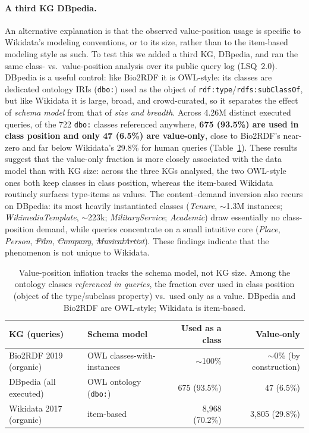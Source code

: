 \documentclass[sw]{iosart2x}
\providecommand{\DIFadd}[1]{{\protect\color{blue}\uwave{#1}}} %
\providecommand{\DIFdel}[1]{{\protect\color{red}\sout{#1}}} %
\providecommand{\DIFaddbegin}{} %
\providecommand{\DIFaddend}{} %
\providecommand{\DIFdelbegin}{} %
\providecommand{\DIFdelend}{} %
\providecommand{\DIFscaledelfig}{0.5}
\newlength{\DIFdelgraphicswidth} %
\newlength{\DIFdelgraphicsheight} %
\providecommand{\DIFaddincludegraphics}[2][]{{\color{blue}\fbox{\DIFOincludegraphics[#1]{#2}}}} %
\providecommand{\DIFdelincludegraphics}[2][]{%
\sbox{\DIFdelgraphicsbox}{\DIFOincludegraphics[#1]{#2}}%
\settoboxwidth{\DIFdelgraphicswidth}{\DIFdelgraphicsbox} %
\settoboxtotalheight{\DIFdelgraphicsheight}{\DIFdelgraphicsbox} %
\scalebox{\DIFscaledelfig}{%
\parbox[b]{\DIFdelgraphicswidth}{\usebox{\DIFdelgraphicsbox}\\[-\baselineskip] \rule{\DIFdelgraphicswidth}{0em}}\llap{\resizebox{\DIFdelgraphicswidth}{\DIFdelgraphicsheight}{%
\setlength{\unitlength}{\DIFdelgraphicswidth}%
\begin{picture}(1,1)%
\thicklines\linethickness{2pt} %
{\color[rgb]{1,0,0}\put(0,0){\framebox(1,1){}}}%
{\color[rgb]{1,0,0}\put(0,0){\line( 1,1){1}}}%
{\color[rgb]{1,0,0}\put(0,1){\line(1,-1){1}}}%
\end{picture}%
}\hspace*{3pt}}} %
} %
\DeclareRobustCommand{\DIFaddbegin}{\DIFOaddbegin \let\includegraphics\DIFaddincludegraphics} %
\DeclareRobustCommand{\DIFaddend}{\DIFOaddend \let\includegraphics\DIFOincludegraphics} %
\DeclareRobustCommand{\DIFdelbegin}{\DIFOdelbegin \let\includegraphics\DIFdelincludegraphics} %
\DeclareRobustCommand{\DIFdelend}{\DIFOaddend \let\includegraphics\DIFOincludegraphics} %
\begin{document}
\paragraph{\textbf{A third KG DBpedia.}} An alternative explanation is that the observed value-position usage is specific to Wikidata's modeling conventions, or to its size, rather than to the item-based modeling style as such. To test this we added a third KG, DBpedia, and ran the same class- vs.\ value-position analysis over its public query log (LSQ~2.0). DBpedia is a useful control: like Bio2RDF it is OWL-style: its classes are dedicated ontology IRIs (\texttt{dbo:}) used as the object of \texttt{rdf:type}/\texttt{rdfs:subClassOf}, but like Wikidata it is large, broad, and crowd-curated, so it separates the effect of \emph{schema model} from that of \emph{size and breadth}. Across 4.26M distinct executed queries, of the 722 \texttt{dbo:} classes referenced anywhere, \textbf{675 (93.5\%) are used in class position and only 47 (6.5\%) are value-only}, close to Bio2RDF's near-zero and far below Wikidata's 29.8\% for human queries (Table~\ref{tab:generality}). These results suggest that the value-only fraction is more closely associated with the data model than with KG size: across the three KGs analysed, the two OWL-style ones both keep classes in class position, whereas the item-based Wikidata routinely surfaces type-items as values. The content--demand inversion also recurs on DBpedia: its most heavily instantiated classes (\emph{Tenure}, $\sim$1.3M instances; \emph{WikimediaTemplate}, $\sim$223k; \emph{MilitaryService}; \emph{Academic}) draw essentially no class-position demand, while queries concentrate on a small intuitive core (\emph{Place}, \DIFaddbegin \emph{\DIFadd{Airport}}\DIFadd{, }\DIFaddend \emph{Person}, \emph{\DIFdelbegin \DIFdel{Film}\DIFdelend \DIFaddbegin \DIFadd{MusicalArtist}\DIFaddend }, \emph{\DIFdelbegin \DIFdel{Company}\DIFdelend \DIFaddbegin \DIFadd{PopulatedPlace}\DIFaddend }, \emph{\DIFdelbegin \DIFdel{MusicalArtist}\DIFdelend \DIFaddbegin \DIFadd{Film}\DIFaddend }). These findings indicate that the phenomenon is not unique to Wikidata.

\begin{table}[ht]
\centering
\caption{Value-position inflation tracks the schema model, not KG size. Among the ontology classes \emph{referenced in queries}, the fraction ever used in class position (object of the type/subclass property) vs.\ used only as a value. DBpedia and Bio2RDF are OWL-style; Wikidata is item-based.}
\label{tab:generality}
\begin{tabular}{l|l|r|r}
\hline
KG (queries) & Schema model & Used as a class & Value-only \\
\hline
Bio2RDF 2019 (organic) & OWL classes-with-instances & $\sim$100\% & $\sim$0\% (by construction) \\
DBpedia (all executed) & OWL ontology (\texttt{dbo:}) & 675 (93.5\%) & 47 (6.5\%) \\
Wikidata 2017 (organic) & item-based & 8,968 (70.2\%) & 3,805 (29.8\%) \\
\hline
\end{tabular}
\end{table}
\end{document}

